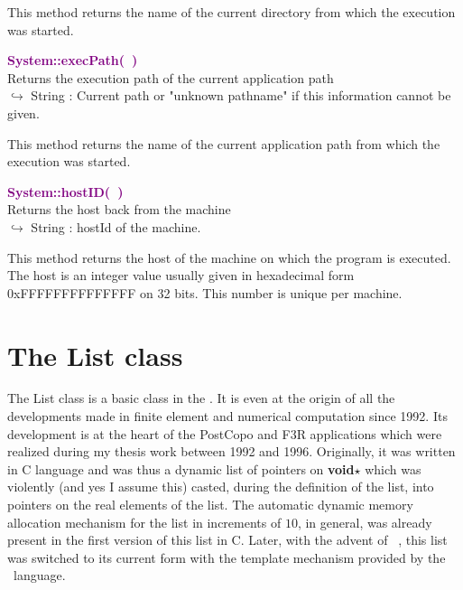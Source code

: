 This method returns the name of the current directory from which the execution was started.

\textcolor{purple}{\textbf{System::execPath(~)}}\label{System::execPath()}\\
Returns the execution path of the current application path\\ \hspace*{10mm}$\hookrightarrow$ String : Current path or "unknown pathname" if this information cannot be given.

This method returns the name of the current application path from which the execution was started.

\textcolor{purple}{\textbf{System::hostID(~)}}\label{System::hostID()}\\
Returns the host back from the machine\\ \hspace*{10mm}$\hookrightarrow$ String : hostId of the machine.

This method returns the host of the machine on which the program is executed. The host is an integer value usually given in hexadecimal form 0xFFFFFFFFFFFFFF on 32 bits. This number is unique per machine.

\section{The List class}

The List class is a basic class in the \DynELA. It is even at the origin of all the developments made in finite element and numerical computation since 1992. Its development is at the heart of the PostCopo and F3R applications which were realized during my thesis work between 1992 and 1996. Originally, it was written in C language and was thus a dynamic list of pointers on \textbf{void$\star$} which was violently (and yes I assume this) casted, during the definition of the list, into pointers on the real elements of the list. The automatic dynamic memory allocation mechanism for the list in increments of $10$, in general, was already present in the first version of this list in C. Later, with the advent of \Cpp~, this list was switched to its current form with the template mechanism provided by the \Cpp~language.

